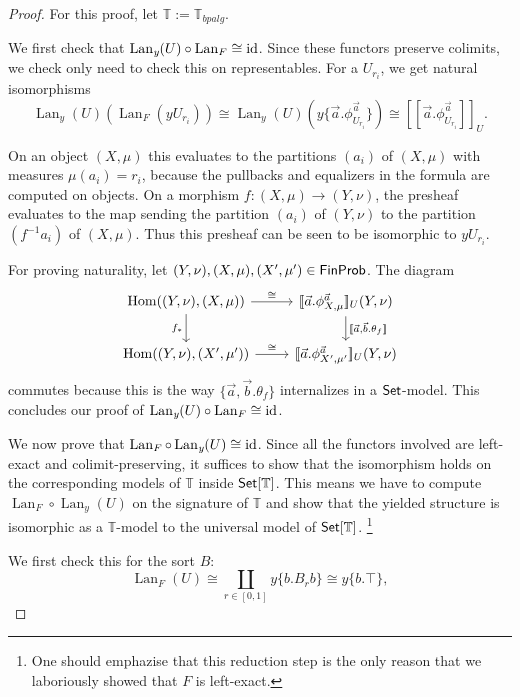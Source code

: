 \documentclass[a4paper]{amsproc}
\theoremstyle{plain}
\theoremstyle{definition}
\theoremstyle{remark}
\numberwithin{equation}{section}
\newcommand{\id}{\textup{id}}
\DeclareMathOperator{\Hom}{Hom}
\newcommand{\y}{\textit{y}}
\DeclareMathOperator{\Lan}{Lan}
\newcommand{\Set}{\textup{\textsf{Set}}}
\newcommand{\FinProb}{\textup{\textsf{FinProb}}}
\newcommand{\ldoub}{[\![}
\newcommand{\rdoub}{]\!]}
\begin{document}
\begin{proof}
For this proof, let $\mathbb{T} := \mathbb{T}_{bpalg}$.

We first check that $\Lan_{\y}(U) \circ \Lan_F \cong \id$. Since these functors preserve colimits, we check only need to check this on representables. For a $U_{r_i}$, we get natural isomorphisms 
\begin{equation*}
\Lan_{\y}(U)(\Lan_F(\y U_{r_i}))
\cong \Lan_{\y}(U)(\y \{\vec{a} . \phi^{\vec{a}}_{U_{r_i}} \})
\cong \ldoub \vec{a} . \phi^{\vec{a}}_{U_{r_i}} \rdoub_U .
\end{equation*}

On an object $(X,\mu)$ this evaluates to the partitions $(a_i)$ of $(X,\mu)$ with measures $\mu(a_i) = r_i$, because the pullbacks and equalizers in the formula are computed on objects. On a morphism $f: (X,\mu) \to (Y,\nu)$, the presheaf evaluates to the map sending the partition $(a_i)$ of $(Y,\nu)$ to the partition $(f^{-1}a_i)$ of $(X,\mu)$. Thus this presheaf can be seen to be isomorphic to $\y U_{r_i}$.

For proving naturality, let $(Y,\nu), (X,\mu), (X',\mu') \in \FinProb$. The diagram
\[
\begin{tikzcd}
    {\Hom((Y,\nu),(X,\mu))} \arrow[r, "\cong"] \arrow[d, "f_*"'] & {\ldoub \vec{a} . \phi^{\vec{a}}_{X,\mu} \rdoub_U (Y,\nu)} \arrow[d, "{\ldoub \vec{a},\vec{b} . \theta_f \rdoub}"] \\
    {\Hom((Y,\nu),(X',\mu'))} \arrow[r, "\cong"]                 & {\ldoub \vec{a} . \phi^{\vec{a}}_{X',\mu'} \rdoub_U (Y,\nu)}
\end{tikzcd}
\]
commutes because this is the way $\{\vec{a},\vec{b} . \theta_f \}$ internalizes in a $\Set$-model. This concludes our proof of $\Lan_{\y}(U) \circ \Lan_F \cong \id$.

We now prove that $\Lan_F \circ \Lan_{\y}(U) \cong \id$. Since all the functors involved are left-exact and colimit-preserving, it suffices to show that the isomorphism holds on the corresponding models of $\mathbb{T}$ inside $\Set[\mathbb{T}]$. This means we have to compute $\Lan_F \circ \Lan_{\y}(U)$ on the signature of $\mathbb{T}$ and show that the yielded structure is isomorphic as a $\mathbb{T}$-model to the universal model of $\Set[\mathbb{T}]$. \footnote{One should emphazise that this reduction step is the only reason that we laboriously showed that $F$ is left-exact.}

We first check this for the sort $B$:
\begin{equation}\label{lan_on_sort}
\Lan_F(U) \cong \coprod_{r \in [0,1]} \y \{b . B_r b\} \cong \y \{b . \top\}, \tag{*}
\end{equation}


\end{proof}
\end{document}
